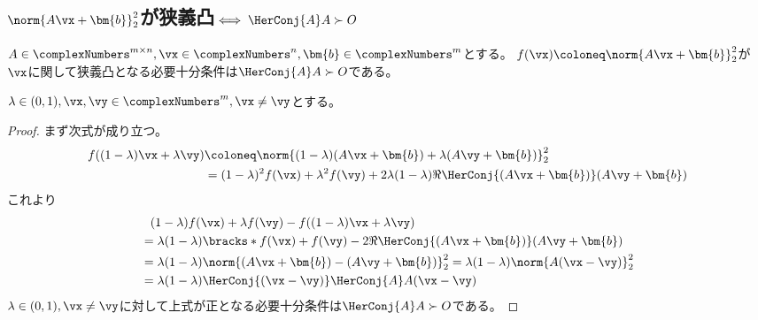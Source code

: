         \subsection{\texorpdfstring{$\norm{A\vx+\bm{b}}_2^2$}{||Ax+b||\string^2}が狭義凸\texorpdfstring{$\iff \HerConj{A}A\succ O$}{⇔ A*Aが正定}}
            \begin{shadebox}
                $A \in \complexNumbers^{m\times n}, \vx \in \complexNumbers^n, \bm{b} \in \complexNumbers^m$とする。
                $f(\vx) \coloneq \norm{A\vx+\bm{b}}_2^2$が$\vx$に関して狭義凸となる必要十分条件は$\HerConj{A}A\succ O$である。
            \end{shadebox}
            $\lambda \in (0,1), \vx,\vy \in \complexNumbers^m, \vx\neq\vy$とする。
            \begin{proof}
                まず次式が成り立つ。
                \begin{align*}
                    f((1-\lambda)\vx + \lambda\vy) &\coloneq \norm{(1-\lambda)(A\vx+\bm{b}) + \lambda(A\vy+\bm{b})}_2^2 \\
                    &= (1-\lambda)^2 f(\vx) + \lambda^2 f(\vy) + 2\lambda(1-\lambda)\Re{\HerConj{(A\vx+\bm{b})}(A\vy+\bm{b})}
                \end{align*}
                これより
                \begin{align*}
                    &\phantom{=} (1-\lambda)f(\vx) + \lambda f(\vy) - f((1-\lambda)\vx + \lambda\vy) \\
                    &= \lambda(1-\lambda)\bracks*{f(\vx) + f(\vy) - 2\Re{\HerConj{(A\vx+\bm{b})}(A\vy+\bm{b})}} \\
                    &= \lambda(1-\lambda)\norm{(A\vx+\bm{b}) - (A\vy+\bm{b})}_2^2 = \lambda(1-\lambda)\norm{A(\vx-\vy)}_2^2 \\
                    &= \lambda(1-\lambda)\HerConj{(\vx-\vy)}\HerConj{A}A(\vx-\vy)
                \end{align*}
                $\lambda \in (0,1),\vx\neq\vy$に対して上式が正となる必要十分条件は$\HerConj{A}A\succ O$である。
            \end{proof}